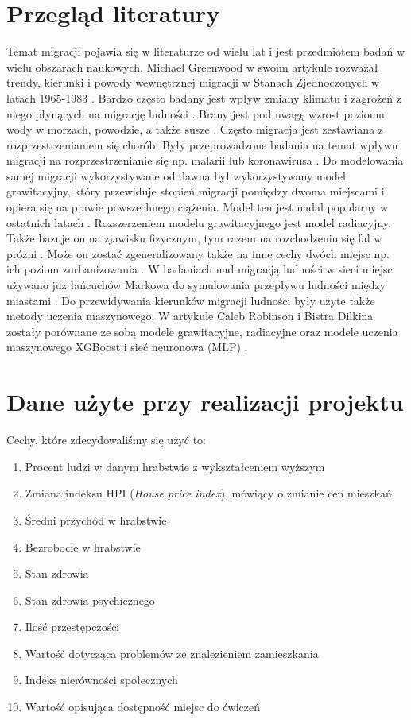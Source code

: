 \documentclass[a4paper,12pt]{article}
\begin{document}
\section*{Przegląd literatury}
Temat migracji pojawia się w literaturze od wielu lat i jest przedmiotem badań w wielu obszarach naukowych.  Michael Greenwood w swoim artykule rozważał trendy, kierunki i powody wewnętrznej migracji w Stanach Zjednoczonych w latach 1965-1983 \cite*{Greenwood1985HumanMT}. Bardzo często badany jest wpływ zmiany klimatu i zagrożeń z niego płynących na migrację ludności \cite{ijerph17176036}. Brany jest pod uwagę wzrost poziomu wody w morzach, powodzie, a także susze \cite{climatemigrate, DeLellis2021Modeling, Isaacman2018Modeling}. Często migracja jest zestawiana z rozprzestrzenianiem się chorób. Były przeprowadzone badania na temat wpływu migracji na rozprzestrzenianie się np. malarii lub koronawirusa \cite{Rejeki2018Time, covidmigrations}.
Do modelowania samej migracji wykorzystywane od dawna był wykorzystywany model grawitacyjny, który przewiduje stopień migracji pomiędzy dwoma miejscami i opiera się na prawie powszechnego ciążenia. Model ten jest nadal popularny w ostatnich latach \cite{grawitacja}.  Rozszerzeniem modelu grawitacyjnego jest model radiacyjny. Także bazuje on na zjawisku fizycznym, tym razem na rozchodzeniu się fal w próżni \cite{Simini2012Universal}. Może on zostać zgeneralizowany także na inne cechy dwóch miejsc  np. ich poziom zurbanizowania \cite{Alis2021Generalized}.  W badaniach nad migracją ludności w sieci miejsc używano już łańcuchów Markowa do symulowania przepływu ludności między miastami \cite{PAN199431}.  Do przewidywania kierunków migracji ludności były użyte także metody uczenia maszynowego. W artykule Caleb Robinson i Bistra Dilkina zostały porównane ze sobą modele grawitacyjne, radiacyjne oraz modele uczenia maszynowego XGBoost i sieć neuronowa (MLP) \cite{robinson2017machine}.



\section*{Dane użyte przy realizacji projektu}
Cechy, które zdecydowaliśmy się użyć to:
\begin{enumerate}
    \item Procent ludzi w danym hrabstwie z wykształceniem wyższym
    \item Zmiana indeksu HPI (\textit{House price index}), mówiący o zmianie cen mieszkań
    \item Średni przychód w hrabstwie
    \item Bezrobocie w hrabstwie
    \item Stan zdrowia
    \item Stan zdrowia psychicznego
    \item Ilość przestępczości
    \item Wartość dotycząca problemów ze znalezieniem zamieszkania
    \item Indeks nierówności społecznych
    \item Wartość opisująca dostępność miejsc do ćwiczeń
\end{enumerate}
\end{document}
